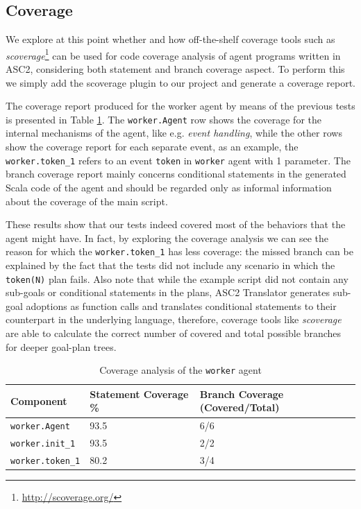 \subsection{Coverage}


We explore at this point whether and how off-the-shelf coverage tools such as \textit{scoverage}\footnote{\url{http://scoverage.org/}} can be used for code coverage analysis of agent programs written in ASC2, considering both statement and branch coverage aspect. To perform this we simply add the scoverage plugin to our project and generate a coverage report.

The coverage report produced for the worker agent by means of the previous tests is presented in Table \ref{tab:coverage}. The \texttt{worker.Agent} row shows the coverage for the internal mechanisms of the agent, like e.g. \textit{event handling}, 
while the other rows show the coverage report for each separate event, as an example, the \texttt{worker.token\_1} refers to an event \texttt{token} in \texttt{worker} agent with 1 parameter. The branch coverage report mainly concerns conditional statements in the generated Scala code of the agent and should be regarded only as informal information about the coverage of the main script.

These results show that our tests indeed covered most of the behaviors that the agent might have. In fact, by exploring the coverage analysis we can see the reason for which the \texttt{worker.token\_1} has less coverage: the missed branch can be explained by the fact that the tests did not include any scenario in which the \texttt{token(N)} plan fails. Also note that while the example script did not contain any sub-goals or conditional statements in the plans, ASC2 Translator generates sub-goal adoptions as function calls and translates conditional statements to their counterpart in the underlying language, therefore, coverage tools like \textit{scoverage} are able to calculate the correct number of covered and total possible branches for deeper goal-plan trees.
\vspace{-5pt}

\setlength{\tabcolsep}{0.5em} %
{\renewcommand{\arraystretch}{1.1}%
\begin{table}
    \centering
    \begin{tabular}{lll}
        \toprule
        Component &  Statement Coverage \% & Branch Coverage (Covered/Total) \\
        \midrule
       \texttt{worker.Agent}  &  93.5  & 6/6 \\
       \texttt{worker.init\_1} &  93.5  & 2/2 \\
       \texttt{worker.token\_1} &  80.2  & 3/4 \\ \bottomrule
    \end{tabular}
    \vspace{5pt}
    \caption{Coverage analysis of the \texttt{worker} agent}
    \label{tab:coverage}
    \vspace{-10pt}
\end{table}
}

